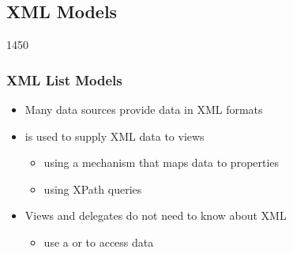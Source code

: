 %
%
%
%

\subsection{XML Models}

\begin{slide}{1450}\frametitle{XML List Models}

\begin{itemize}
\item Many data sources provide data in XML formats
\item {} is used to supply XML data to views
  \begin{itemize}
  \item using a mechanism that maps data to properties
  \item using XPath queries
  \end{itemize}
\item Views and delegates do not need to know about XML
  \begin{itemize}
  \item use a  or  to access data
  \end{itemize}
\end{itemize}

\end{slide}


